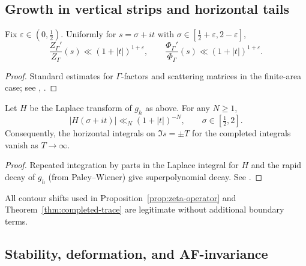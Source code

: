 \subsection{Growth in vertical strips and horizontal tails}
\label{subsec:growth-tails}
\relax\hspace{0pt}

\begin{lemma}\label{lem:vertical-growth}
Fix $\varepsilon\in(0,\tfrac12)$. Uniformly for $s=\sigma+it$ with
$\sigma\in[\tfrac12+\varepsilon, 2-\varepsilon]$,
\[
\frac{Z_\Gamma'}{Z_\Gamma}(s)\ll (1+|t|)^{1+\varepsilon},
\qquad
\frac{\Phi_\Gamma'}{\Phi_\Gamma}(s)\ll (1+|t|)^{1+\varepsilon}.
\]
\end{lemma}

\begin{proof}
Standard estimates for $\Gamma$-factors and scattering matrices in the
finite-area case; see \cite[Thm.~6.6]{IwaniecSpectral},
\cite[Prop.~4.3]{Borthwick}.                                            %
\end{proof}

\begin{lemma}\label{lem:horizontal}
Let $H$ be the Laplace transform of $g_h$ as above. For any $N\ge 1$,
\[
|H(\sigma+it)|\ll_N (1+|t|)^{-N},\qquad \sigma\in[\tfrac12,2].
\]
Consequently, the horizontal integrals on $\Im s=\pm T$ for the
completed integrals vanish as $T\to\infty$.
\end{lemma}

\begin{proof}
Repeated integration by parts in the Laplace integral for $H$ and the
rapid decay of $g_h$ (from Paley–Wiener) give superpolynomial decay.
See \cite[Prop.~2.1]{HejhalII}.                                         %
\end{proof}

\begin{corollary}\label{cor:contour-robust}
All contour shifts used in
Proposition~\ref{prop:zeta-operator} and
Theorem~\ref{thm:completed-trace} are legitimate without additional
boundary terms.                                                          %
\end{corollary}

\subsection{Stability, deformation, and AF-invariance}
\label{subsec:stability-af}
\relax\hspace{0pt}

